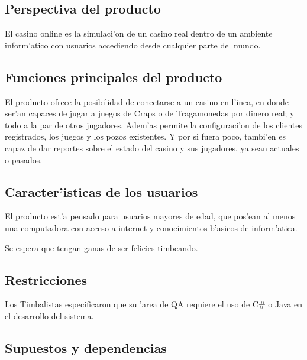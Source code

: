  \subsection{ Perspectiva del producto	}
El casino online es la simulaci'on de un casino real dentro de un ambiente inform'atico con usuarios accediendo desde cualquier parte del mundo.

 \subsection{ Funciones principales del producto }
El producto ofrece la posibilidad de conectarse a un casino en l'inea, en donde ser'an capaces de jugar a juegos de Craps o de Tragamonedas por dinero real; y todo a la par de otros jugadores. Adem'as permite la configuraci'on de los clientes registrados, los juegos y los pozos existentes. Y por si fuera poco, tambi'en es capaz de dar reportes sobre el estado del casino y sus jugadores, ya sean actuales o pasados.

 \subsection{ Caracter'isticas de los usuarios }
El producto est'a pensado para usuarios mayores de edad, que pos'ean al menos una computadora con acceso a internet y conocimientos b'asicos de inform'atica.

Se espera que tengan ganas de ser felicies timbeando.

 \subsection{ Restricciones }
Los Timbalistas especificaron que su 'area de QA requiere el uso de C\# o Java en el desarrollo del sistema.

 \subsection{ Supuestos y dependencias	}

